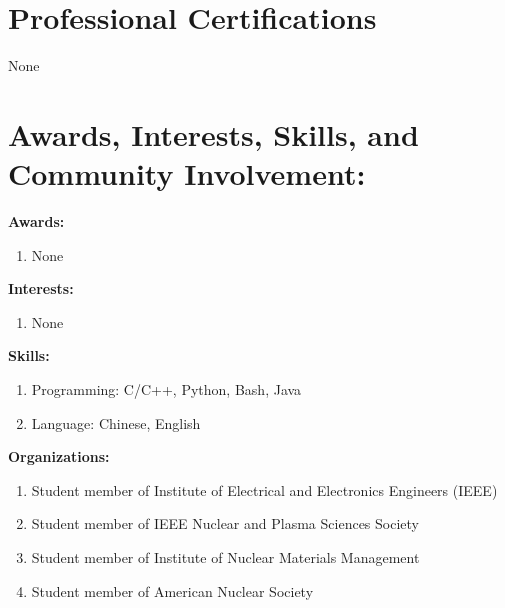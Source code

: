 \documentclass[letterpaper,11pt]{article} %
\begin{document}
\section{Professional Certifications}
None

\section{Awards, Interests, Skills, and Community Involvement:}
\hspace{1.5em}\textbf{Awards:}
 \begin{enumerate}[label={},nolistsep]
     \item None
\end{enumerate}
\hspace{1.5em}\textbf{Interests:}
 \begin{enumerate}[label={},nolistsep]
     \item None
\end{enumerate}
\hspace{1.5em}\textbf{Skills:}
 \begin{enumerate}[label={},nolistsep]
     \item {Programming}{: C/C++, Python, Bash, Java}
     \item {Language}{: Chinese, English}
\end{enumerate}
\hspace{1.5em}\textbf{Organizations:}
 \begin{enumerate}[label={},nolistsep]
    \item Student member of Institute of Electrical and Electronics Engineers (IEEE)
    \item Student member of IEEE Nuclear and Plasma Sciences Society
    \item Student member of Institute of Nuclear Materials Management
    \item Student member of American Nuclear Society
\end{enumerate}
\end{document}
